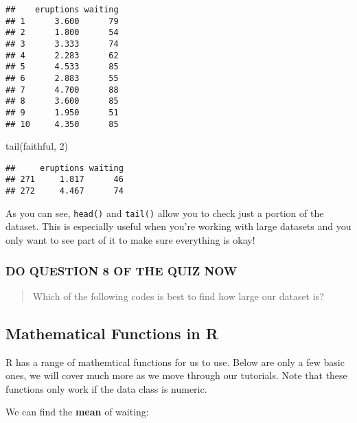 \documentclass[
]{book}
\newenvironment{Shaded}{\begin{snugshade}}{\end{snugshade}}
\newcommand{\DecValTok}[1]{\textcolor[rgb]{0.00,0.00,0.81}{#1}}
\newcommand{\FunctionTok}[1]{\textcolor[rgb]{0.00,0.00,0.00}{#1}}
\newcommand{\NormalTok}[1]{#1}
\newcommand{\SpecialCharTok}[1]{\textcolor[rgb]{0.00,0.00,0.00}{#1}}
\begin{document}
\begin{verbatim}
##    eruptions waiting
## 1      3.600      79
## 2      1.800      54
## 3      3.333      74
## 4      2.283      62
## 5      4.533      85
## 6      2.883      55
## 7      4.700      88
## 8      3.600      85
## 9      1.950      51
## 10     4.350      85
\end{verbatim}

\begin{Shaded}
\begin{Highlighting}[]
\FunctionTok{tail}\NormalTok{(faithful, }\DecValTok{2}\NormalTok{)}
\end{Highlighting}
\end{Shaded}

\begin{verbatim}
##     eruptions waiting
## 271     1.817      46
## 272     4.467      74
\end{verbatim}

As you can see, \texttt{head()} and \texttt{tail()} allow you to check just a portion of the dataset. This is especially useful when you're working with large datasets and you only want to see part of it to make sure everything is okay!

\hypertarget{do-question-8-of-the-quiz-now}{%
\subsubsection{DO QUESTION 8 OF THE QUIZ NOW}\label{do-question-8-of-the-quiz-now}}

\begin{quote}
Which of the following codes is best to find how large our dataset is?
\end{quote}

\hypertarget{mathematical-functions-in-r}{%
\subsection{Mathematical Functions in R}\label{mathematical-functions-in-r}}

R has a range of mathemtical functions for us to use. Below are only a few basic ones, we will cover much more as we move through our tutorials. Note that these functions only work if the data class is numeric.

We can find the \textbf{mean} of waiting:

\begin{Shaded}
\end{Shaded}
\end{document}

